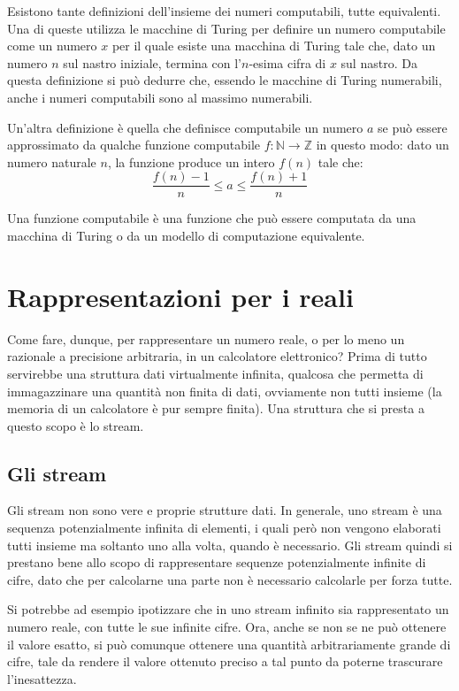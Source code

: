 \documentclass[Lau]{sapthesis}
\begin{document}
Esistono tante definizioni dell'insieme dei numeri computabili, tutte equivalenti. Una di queste \cite{Minsky} utilizza le macchine di Turing per definire un numero computabile come un numero $x$ per il quale esiste una macchina di Turing tale che, dato un numero $n$ sul nastro iniziale, termina con l'$n$-esima cifra di $x$ sul nastro. Da questa definizione si può dedurre che, essendo le macchine di Turing numerabili, anche i numeri computabili sono al massimo numerabili.

Un'altra definizione è quella che definisce computabile un numero $a$ se può essere approssimato da qualche funzione computabile $f : \mathbb{N} \rightarrow \mathbb{Z}$ in questo modo: dato un numero naturale $n$, la funzione produce un intero $f(n)$ tale che:
$$\frac{f(n)-1}{n} \leq a \leq \frac{f(n)+1}{n}$$

Una funzione computabile è una funzione che può essere computata da una macchina di Turing o da un modello di computazione equivalente.


\section{Rappresentazioni per i reali}
Come fare, dunque, per rappresentare un numero reale, o per lo meno un razionale 
a precisione arbitraria, in un calcolatore elettronico? Prima di tutto 
servirebbe una struttura dati virtualmente infinita, qualcosa che permetta di 
immagazzinare una quantità non finita di dati, ovviamente non tutti insieme (la 
memoria di un calcolatore è pur sempre finita). Una struttura che si presta a 
questo scopo è lo stream.


\subsection{Gli stream}
Gli stream non sono vere e proprie strutture dati. In generale, uno stream è una 
sequenza potenzialmente infinita di elementi, i quali però non vengono elaborati tutti insieme ma 
soltanto uno alla volta, quando è necessario. Gli stream quindi si prestano bene 
allo scopo di rappresentare sequenze potenzialmente infinite di cifre, dato che 
per calcolarne una parte non è necessario calcolarle per forza tutte.

Si potrebbe ad esempio ipotizzare che in uno stream infinito sia rappresentato 
un numero reale, con tutte le sue infinite cifre. Ora, anche se non se ne può 
ottenere il valore esatto, si può comunque ottenere una quantità arbitrariamente 
grande di cifre, tale da rendere il valore ottenuto preciso a tal punto da 
poterne trascurare l'inesattezza.
\end{document}
